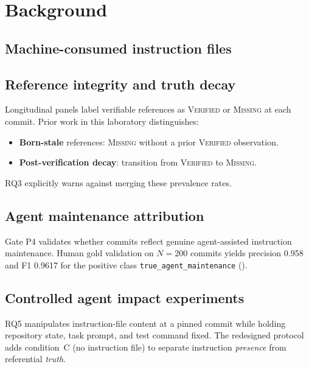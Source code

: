 \section{Background}
\label{sec:background}

\subsection{Machine-consumed instruction files}

\subsection{Reference integrity and truth decay}
Longitudinal panels label verifiable references as \textsc{Verified} or \textsc{Missing} at each commit.
Prior work in this laboratory distinguishes:
\begin{itemize}
  \item \textbf{Born-stale} references: \textsc{Missing} without a prior \textsc{Verified} observation.
  \item \textbf{Post-verification decay}: transition from \textsc{Verified} to \textsc{Missing}.
\end{itemize}
RQ3 explicitly warns against merging these prevalence rates.

\subsection{Agent maintenance attribution}
Gate P4 validates whether commits reflect genuine agent-assisted instruction maintenance.
Human gold validation on $N=200$ commits yields precision 0.958 and F1 0.9617 for the positive class \texttt{true\_agent\_maintenance} ().

\subsection{Controlled agent impact experiments}
RQ5 manipulates instruction-file content at a pinned commit while holding repository state, task prompt, and test command fixed.
The redesigned protocol adds condition~C (no instruction file) to separate instruction \emph{presence} from referential \emph{truth}.
